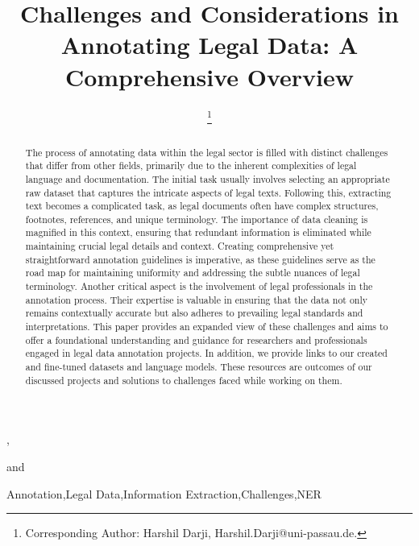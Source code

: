\documentclass{IOS-Book-Article}
\def\hb{\hbox to 11.5 cm{}}
\begin{document}
\pagestyle{headings}
\def\thepage{}
\begin{frontmatter}              %


\title{Challenges and Considerations in Annotating Legal Data: A Comprehensive Overview}

\markboth{}{November 2023\hb}

\author[A]{ %
\thanks{Corresponding Author: Harshil Darji, Harshil.Darji@uni-passau.de.}},
\author[A,B]{ }
and
\author[A]{ }

\address[A]{Chair of Data Science, University of Passau, Innstraße 41, 94032 Passau, Germany}
\address[B]{The Institute for Artificial Intelligence Research and Development of Serbia, Serbia}

\begin{abstract}
The process of annotating data within the legal sector is filled with distinct challenges that differ from other fields, primarily due to the inherent complexities of legal language and documentation. The initial task usually involves selecting an appropriate raw dataset that captures the intricate aspects of legal texts. Following this, extracting text becomes a complicated task, as legal documents often have complex structures, footnotes, references, and unique terminology. The importance of data cleaning is magnified in this context, ensuring that redundant information is eliminated while maintaining crucial legal details and context. Creating comprehensive yet straightforward annotation guidelines is imperative, as these guidelines serve as the road map for maintaining uniformity and addressing the subtle nuances of legal terminology. Another critical aspect is the involvement of legal professionals in the annotation process. Their expertise is valuable in ensuring that the data not only remains contextually accurate but also adheres to prevailing legal standards and interpretations. This paper provides an expanded view of these challenges and aims to offer a foundational understanding and guidance for researchers and professionals engaged in legal data annotation projects. In addition, we provide links to our created and fine-tuned datasets and language models. These resources are outcomes of our discussed projects and solutions to challenges faced while working on them.
\end{abstract}

\begin{keyword}
Annotation\sep Legal Data\sep Information Extraction\sep Challenges\sep NER
\end{keyword}

\end{frontmatter}
\markboth{November 2023\hb}{November 2023\hb}
\end{document}
